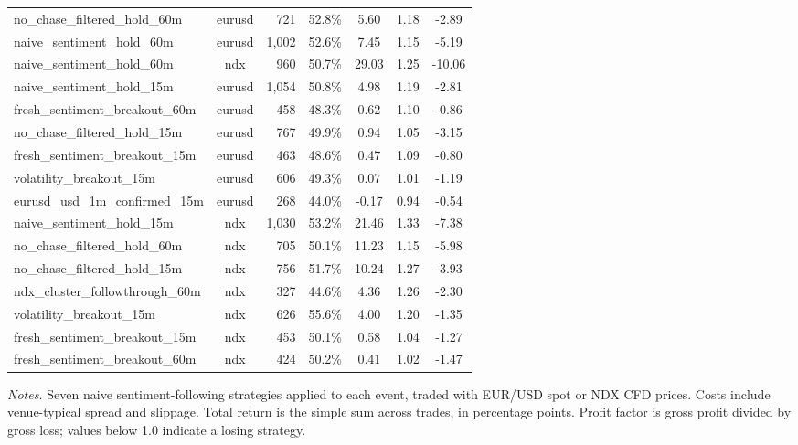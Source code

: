 \begin{table}[!htbp]
\begin{threeparttable}
\begin{tabular}{lcrcccc}
no\_chase\_filtered\_hold\_60m & eurusd & 721 & 52.8\% & 5.60 & 1.18 & -2.89 \\
naive\_sentiment\_hold\_60m & eurusd & 1,002 & 52.6\% & 7.45 & 1.15 & -5.19 \\
naive\_sentiment\_hold\_60m & ndx & 960 & 50.7\% & 29.03 & 1.25 & -10.06 \\
naive\_sentiment\_hold\_15m & eurusd & 1,054 & 50.8\% & 4.98 & 1.19 & -2.81 \\
fresh\_sentiment\_breakout\_60m & eurusd & 458 & 48.3\% & 0.62 & 1.10 & -0.86 \\
no\_chase\_filtered\_hold\_15m & eurusd & 767 & 49.9\% & 0.94 & 1.05 & -3.15 \\
fresh\_sentiment\_breakout\_15m & eurusd & 463 & 48.6\% & 0.47 & 1.09 & -0.80 \\
volatility\_breakout\_15m & eurusd & 606 & 49.3\% & 0.07 & 1.01 & -1.19 \\
eurusd\_usd\_1m\_confirmed\_15m & eurusd & 268 & 44.0\% & -0.17 & 0.94 & -0.54 \\
naive\_sentiment\_hold\_15m & ndx & 1,030 & 53.2\% & 21.46 & 1.33 & -7.38 \\
no\_chase\_filtered\_hold\_60m & ndx & 705 & 50.1\% & 11.23 & 1.15 & -5.98 \\
no\_chase\_filtered\_hold\_15m & ndx & 756 & 51.7\% & 10.24 & 1.27 & -3.93 \\
ndx\_cluster\_followthrough\_60m & ndx & 327 & 44.6\% & 4.36 & 1.26 & -2.30 \\
volatility\_breakout\_15m & ndx & 626 & 55.6\% & 4.00 & 1.20 & -1.35 \\
fresh\_sentiment\_breakout\_15m & ndx & 453 & 50.1\% & 0.58 & 1.04 & -1.27 \\
fresh\_sentiment\_breakout\_60m & ndx & 424 & 50.2\% & 0.41 & 1.02 & -1.47 \\
\bottomrule
\end{tabular}
\begin{tablenotes}
\footnotesize
\item \textit{Notes.} Seven naive sentiment-following strategies
applied to each event, traded with EUR/USD spot or NDX CFD prices.
Costs include venue-typical spread and slippage. Total return is
the simple sum across trades, in percentage points. Profit factor
is gross profit divided by gross loss; values below 1.0 indicate
a losing strategy.
\end{tablenotes}
\end{threeparttable}
\end{table}

